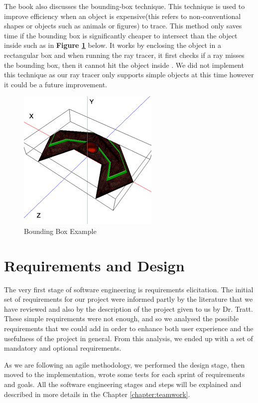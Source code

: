\documentclass[a4paper]{report}
\begin{document}
	\par The book also discusses the bounding-box technique. This technique is used to improve efficiency when an object is expensive(this refers to non-conventional shapes or objects such as animals or figures) to trace. This method only saves time if the bounding box is significantly cheaper to intersect than the object inside such as in \textbf{Figure \ref{fig:boundingbox}} below. It works by enclosing the object in a rectangular box and when running the ray tracer, it first checks if a ray misses the bounding box, then it cannot hit the object inside \cite{suffern_ray_2007}. We did not implement this technique as our ray tracer only supports simple objects at this time however it could be a future improvement.
	
	\begin{figure}[ht!]
		\centering
		\includegraphics[scale=0.60]{./boundingbox.png}
		\caption{Bounding Box Example}
		\label{fig:boundingbox}
	\end{figure}
	
	\chapter{Requirements and Design} 
	\label{chapter:requirements}The very first stage of software engineering is requirements elicitation. The initial set of requirements for our project were informed partly by the literature that we have reviewed and also by the description of the project given to us by Dr. Tratt. These simple requirements were not enough, and so we analysed the possible requirements that we could add in order to enhance both user experience and the usefulness of the project in general. From this analysis, we ended up with a set of mandatory and optional requirements.\newline
	\par As we are following an agile methodology, we performed the design stage, then moved to the implementation, wrote some tests for each sprint of requirements and goals. All the software engineering stages and steps will be explained and described in more details in the Chapter \ref{chapter:teamwork}.
	
\end{document}
